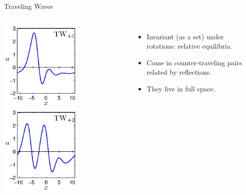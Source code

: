 \documentclass{beamer}
\begin{document}
\begin{frame}{Traveling Waves}
 \begin{columns}
 \includegraphics[width=0.6\textwidth,clip=true]{../../figs/ks22_TW1_profile}\\
 \includegraphics[width=0.6\textwidth,clip=true]{../../figs/ks22_TW2_profile}%
 \begin{itemize}
 \item Invariant (as a set) under rotations: relative equilibria.
 \item Come in counter-traveling pairs related by reflections.
 \item They live in full space.
\end{itemize}

 \end{columns}
\end{frame}
\end{document}
